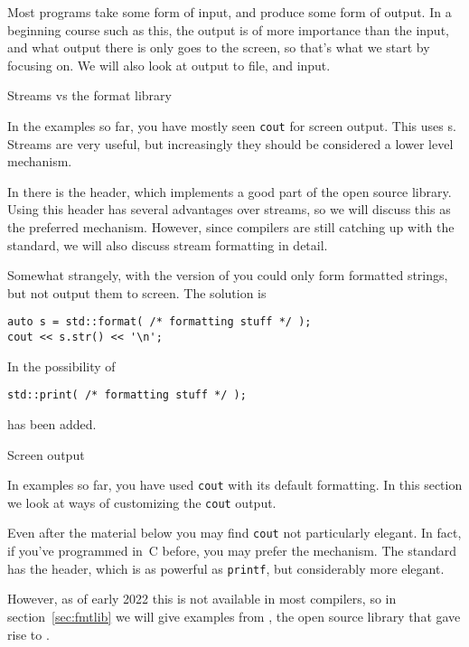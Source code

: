 
Most programs take some form of input, and produce some form of output.
In a beginning course such as this, the output is of more importance than
the input,
and what output there is only goes to the screen,
so that's what we start by focusing on.
We will also look at output to file, and input.

 {Streams vs the format library}

In the examples so far, you have mostly seen \lstinline{cout} for screen output.
This uses s. Streams are very useful, but increasingly
they should be considered a lower level mechanism.

In  there is the  header,
which implements a good part of the open source  library.
Using this header has several advantages over streams, so we will discuss
this as the preferred mechanism.
However, since compilers are still catching up with the  standard,
we will also discuss stream formatting in detail.

Somewhat strangely, with the  version of 
you could only form formatted strings, but not output them to screen.
The solution is
\begin{lstlisting}
auto s = std::format( /* formatting stuff */ );
cout << s.str() << '\n';
\end{lstlisting}
In  the possibility of
\begin{lstlisting}
std::print( /* formatting stuff */ );
\end{lstlisting}
has been added.

 {Screen output}
\label{sec:iomanip}

In examples so far, you have used \lstinline{cout}
with its default formatting.
In this section we look at ways of customizing
the \lstinline{cout} output.
\begin{remark}
  Even after the material below you may find \lstinline{cout}
  not particularly elegant.
  In fact, if you've programmed in~C before,
  you may prefer the  mechanism.
  The  standard
  has the  header, which
  is as powerful as \lstinline{printf}, but considerably more elegant.

  However, as of early 2022 this is not available in most compilers,
  so in section~\ref{sec:fmtlib}
  we will give examples from ,
  the open source library that gave rise to .
\end{remark}

